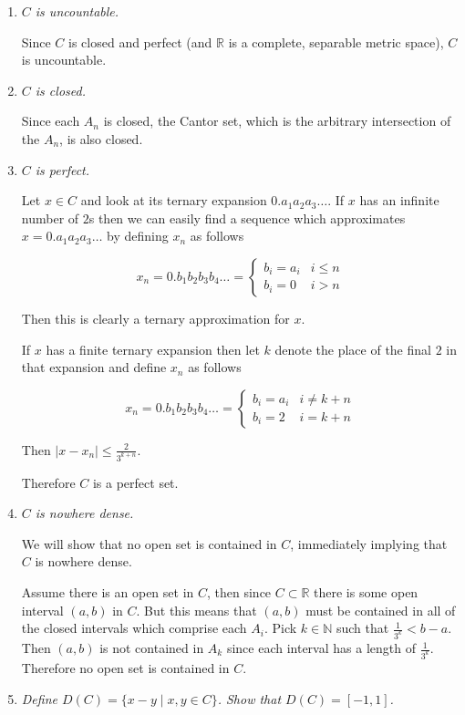 \documentclass[11pt]{article}
\begin{document}
\begin{enumerate}
\begin{enumerate}
\item \emph{$C$ is uncountable.}

Since $C$ is closed and perfect (and $\mathbb{R}$ is a complete, separable metric space), $C$ is uncountable.

\item \emph{$C$ is closed.}

Since each $A_n$ is closed, the Cantor set, which is the arbitrary intersection of the $A_n$, is also closed.

\item \emph{$C$ is perfect.}

Let $x \in C$ and look at its ternary expansion $0.a_1a_2a_3 \ldots$.  If $x$ has an infinite number of $2$s then we can easily find a sequence which approximates $x = 0.a_1a_2a_3 \ldots$ by defining $x_n$ as follows

\begin{equation*}
x_n = 0.b_1b_2b_3b_4 \ldots = 
\begin{cases}
b_i = a_i & i \leq n \\
b_i = 0 & i > n
\end{cases}
\end{equation*}

Then this is clearly a ternary approximation for $x$.

If $x$ has a finite ternary expansion then let $k$ denote the place of the final $2$ in that expansion and define $x_n$ as follows

\begin{equation*}
x_n = 0.b_1b_2b_3b_4 \ldots = 
\begin{cases}
b_i = a_i & i \neq k+n \\
b_i = 2 & i = k+n 
\end{cases}
\end{equation*}

Then $|x - x_n| \leq \frac{2}{3^{k+n}}$.

Therefore $C$ is a perfect set.
\item \emph{$C$ is nowhere dense.}

We will show that no open set is contained in $C$, immediately implying that $C$ is nowhere dense.

Assume there is an open set in $C$, then since $C \subset \mathbb{R}$ there is some open interval $\left(a,b\right)$ in $C$.  But this means that $\left(a,b\right)$ must be contained in all of the closed intervals which comprise each $A_i$.  Pick $k \in \mathbb{N}$ such that $\frac{1}{3^k} < b - a$.  Then $\left(a,b\right)$ is not contained in $A_k$ since each interval has a length of $\frac{1}{3^k}$.  Therefore no open set is contained in $C$.

\item \emph{Define $D(C) = \{x-y \mid x,y \in C\}$.  Show that $D(C) = [-1,1]$.}
\end{enumerate}
\end{enumerate}
\end{document}
